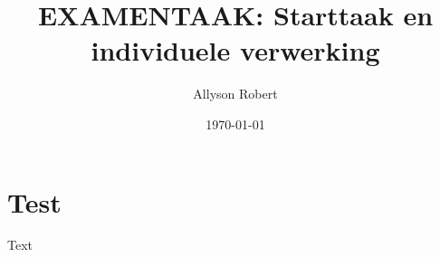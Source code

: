 \documentclass{uhreport}
\title{EXAMENTAAK: Starttaak en individuele verwerking}
\author{Allyson Robert}
\date{\today}
\begin{document}
\maketitle
\tableofcontents
\clearpage

\section{Test}
Text
\end{document}

